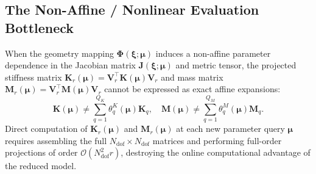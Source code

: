\subsection{The Non-Affine / Nonlinear Evaluation Bottleneck}
\label{subsec:hyperred_bottleneck}
When the geometry mapping $\bm{\Phi}(\bm{\xi}; \bm{\mu})$ induces a non-affine parameter dependence in the Jacobian matrix $\bm{J}(\bm{\xi}; \bm{\mu})$ and metric tensor, the projected stiffness matrix $\bm{K}_r(\bm{\mu}) = \bm{V}_r^\top \bm{K}(\bm{\mu}) \bm{V}_r$ and mass matrix $\bm{M}_r(\bm{\mu}) = \bm{V}_r^\top \bm{M}(\bm{\mu}) \bm{V}_r$ cannot be expressed as exact affine expansions:
\begin{equation}
    \bm{K}(\bm{\mu}) \neq \sum_{q=1}^{Q_K} \theta_q^K(\bm{\mu}) \bm{K}_q, \quad \bm{M}(\bm{\mu}) \neq \sum_{q=1}^{Q_M} \theta_q^M(\bm{\mu}) \bm{M}_q.
\end{equation}
Direct computation of $\bm{K}_r(\bm{\mu})$ and $\bm{M}_r(\bm{\mu})$ at each new parameter query $\bm{\mu}$ requires assembling the full $N_{\text{dof}} \times N_{\text{dof}}$ matrices and performing full-order projections of order $\mathcal{O}(N_{\text{dof}}^2 r)$, destroying the online computational advantage of the reduced model.

